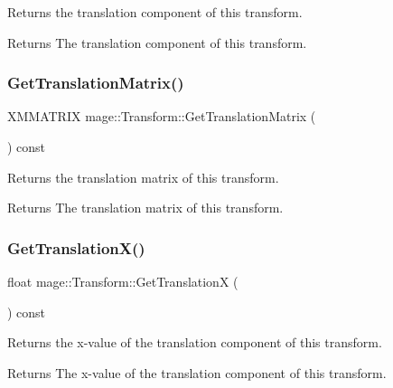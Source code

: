 Returns the translation component of this transform.

\begin{DoxyReturn}{Returns}
The translation component of this transform. 
\end{DoxyReturn}
\hypertarget{structmage_1_1_transform_a4f246a50de8bdfd1bd9dd8e07b7a8c01}{}\label{structmage_1_1_transform_a4f246a50de8bdfd1bd9dd8e07b7a8c01} 
\subsubsection{\texorpdfstring{Get\+Translation\+Matrix()}{GetTranslationMatrix()}}
{\footnotesize\ttfamily X\+M\+M\+A\+T\+R\+IX mage\+::\+Transform\+::\+Get\+Translation\+Matrix (\begin{DoxyParamCaption}{ }\end{DoxyParamCaption}) const}

Returns the translation matrix of this transform.

\begin{DoxyReturn}{Returns}
The translation matrix of this transform. 
\end{DoxyReturn}
\hypertarget{structmage_1_1_transform_a171525f6ba157e319646548f2c459395}{}\label{structmage_1_1_transform_a171525f6ba157e319646548f2c459395} 
\subsubsection{\texorpdfstring{Get\+Translation\+X()}{GetTranslationX()}}
{\footnotesize\ttfamily float mage\+::\+Transform\+::\+Get\+TranslationX (\begin{DoxyParamCaption}{ }\end{DoxyParamCaption}) const}

Returns the x-\/value of the translation component of this transform.

\begin{DoxyReturn}{Returns}
The x-\/value of the translation component of this transform. 
\end{DoxyReturn}
\hypertarget{structmage_1_1_transform_a7feba3c1d24a986e440dd6571edc14b2}{}\label{structmage_1_1_transform_a7feba3c1d24a986e440dd6571edc14b2} 
